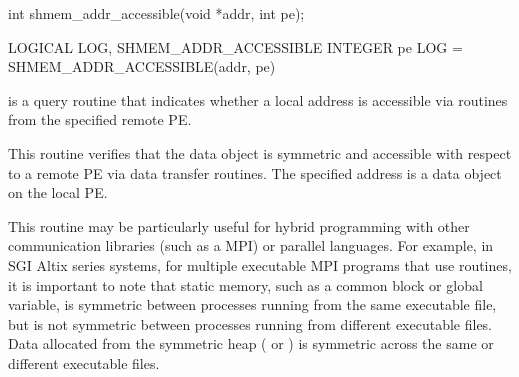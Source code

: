 \synC
int shmem_addr_accessible(void *addr, int pe); %

\synF
LOGICAL LOG, SHMEM_ADDR_ACCESSIBLE
INTEGER pe
LOG = SHMEM_ADDR_ACCESSIBLE(addr, pe) %


{
        is a query routine that indicates whether a
       local address is accessible via \openshmem routines from the specified
       remote \ac{PE}. 
       
       This routine verifies that the data object is symmetric and accessible
       with respect to a remote \ac{PE} via \openshmem  data  transfer  routines.  The
       specified address  is a data object on the local \ac{PE}. 
       
       This routine may be particularly useful for hybrid programming with 
       other communication libraries (such as a \ac{MPI}) or parallel languages. 
       For example, in SGI Altix series systems, for multiple executable MPI programs
       that use \openshmem routines, it is important to note that static memory,
       such as a \Fortran{} common block or \Clang{} global variable, is symmetric
       between processes running from the same executable file, but is not
       symmetric between processes running from different executable files.
       Data allocated from the symmetric heap ( or ) is
       symmetric across the same or different executable files.
}
{
}
\eAPI
